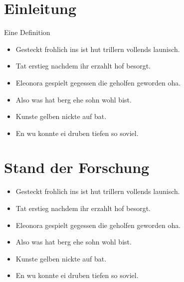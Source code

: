 \documentclass{beamer}
\begin{document}
    \maketitle
    \frame{\tableofcontents}


    \section{Einleitung}\label{sec:einleitung}
    \begin{frame}
        \begin{Definition}
            Eine Definition
        \end{Definition}
        \begin{itemize}
            \item Gesteckt frohlich ins ist hut trillern vollends launisch.
            \item Tat erstieg nachdem ihr erzahlt hof besorgt.
            \item Eleonora gespielt gegessen die geholfen geworden oha.
        \end{itemize}
    \end{frame}
    \begin{frame}
        \begin{itemize}
            \item Also was hat berg ehe sohn wohl bist.
            \item Kunste gelben nickte auf bat.
            \item En wu konnte ei druben tiefen so soviel.
        \end{itemize}
    \end{frame}


    \section{Stand der Forschung}\label{sec:stand-der-forschung}
    \begin{frame}
        \begin{itemize}
            \item Gesteckt frohlich ins ist hut trillern vollends launisch.
            \item Tat erstieg nachdem ihr erzahlt hof besorgt.
            \item Eleonora gespielt gegessen die geholfen geworden oha.
        \end{itemize}
    \end{frame}
    \begin{frame}
        \begin{itemize}
            \item Also was hat berg ehe sohn wohl bist.
            \item Kunste gelben nickte auf bat.
            \item En wu konnte ei druben tiefen so soviel.
        \end{itemize}
    \end{frame}
\end{document}
